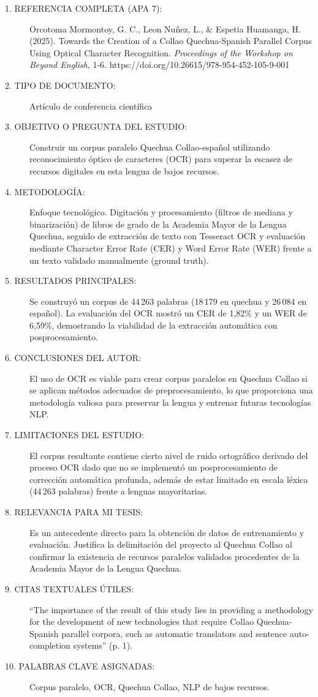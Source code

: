 \begin{description}
	\item[1. REFERENCIA COMPLETA (APA 7):] Orcotoma Mormontoy, G. C., Leon Nuñez, L., \& Espetia Huamanga, H. (2025). Towards the Creation of a Collao Quechua-Spanish Parallel Corpus Using Optical Character Recognition. \textit{Proceedings of the Workshop on Beyond English}, 1-6. https://doi.org/10.26615/978-954-452-105-9-001
	\item[2. TIPO DE DOCUMENTO:] Artículo de conferencia científica
	\item[3. OBJETIVO O PREGUNTA DEL ESTUDIO:] Construir un corpus paralelo Quechua Collao-español utilizando reconocimiento óptico de caracteres (OCR) para superar la escasez de recursos digitales en esta lengua de bajos recursos.
	\item[4. METODOLOGÍA:] Enfoque tecnológico. Digitación y procesamiento (filtros de mediana y binarización) de libros de grado de la Academia Mayor de la Lengua Quechua, seguido de extracción de texto con Tesseract OCR y evaluación mediante Character Error Rate (CER) y Word Error Rate (WER) frente a un texto validado manualmente (ground truth).
	\item[5. RESULTADOS PRINCIPALES:] Se construyó un corpus de 44\,263 palabras (18\,179 en quechua y 26\,084 en español). La evaluación del OCR mostró un CER de 1,82\% y un WER de 6,59\%, demostrando la viabilidad de la extracción automática con posprocesamiento.
	\item[6. CONCLUSIONES DEL AUTOR:] El uso de OCR es viable para crear corpus paralelos en Quechua Collao si se aplican métodos adecuados de preprocesamiento, lo que proporciona una metodología valiosa para preservar la lengua y entrenar futuras tecnologías NLP.
	\item[7. LIMITACIONES DEL ESTUDIO:] El corpus resultante contiene cierto nivel de ruido ortográfico derivado del proceso OCR dado que no se implementó un posprocesamiento de corrección automática profunda, además de estar limitado en escala léxica (44\,263 palabras) frente a lenguas mayoritarias.
	\item[8. RELEVANCIA PARA MI TESIS:] Es un antecedente directo para la obtención de datos de entrenamiento y evaluación. Justifica la delimitación del proyecto al Quechua Collao al confirmar la existencia de recursos paralelos validados procedentes de la Academia Mayor de la Lengua Quechua.
	\item[9. CITAS TEXTUALES ÚTILES:] ``The importance of the result of this study lies in providing a methodology for the development of new technologies that require Collao Quechua-Spanish parallel corpora, such as automatic translators and sentence auto-completion systems'' (p. 1).
	\item[10. PALABRAS CLAVE ASIGNADAS:] Corpus paralelo, OCR, Quechua Collao, NLP de bajos recursos.
\end{description}

